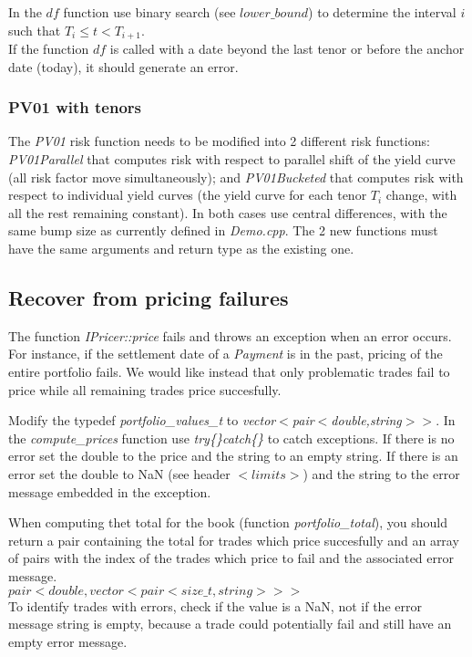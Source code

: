 \documentclass[10pt]{article}
\begin{document}
In the $df$ function use binary search (see $lower\_bound$) to determine the interval $i$ such that $T_i \leq t < T_{i+1}$.\\

If the function $df$ is called with a date beyond the last tenor or before the anchor date (today), it should generate an error.

\subsubsection{PV01 with tenors}
\label{sec:pv01}
The \textit{PV01} risk function needs to be modified into 2 different risk functions: \textit{PV01Parallel} that computes risk with respect to parallel shift of the yield curve (all risk factor move simultaneously); and \textit{PV01Bucketed} that computes risk with respect to individual yield curves (the yield curve for each tenor $T_i$ change, with all the rest remaining constant). In both cases use central differences, with the same bump size as currently defined in \textit{Demo.cpp}. The 2 new functions must have the same arguments and return type as the existing one.

\subsection{Recover from pricing failures}
The function \textit{IPricer::price} fails and throws an exception when an error occurs. For instance, if the settlement date of a \textit{Payment} is in the past, pricing of the entire portfolio fails. We would like instead that only problematic trades fail to price while all remaining trades price succesfully.

Modify the typedef \textit{portfolio\_values\_t} to \textit{vector$<$pair$<$double,string$>>$}. In the \textit{compute\_prices} function use \textit{try\{\}catch\{\}} to catch exceptions. If there is no error set the double to the price and the string to an empty string. If there is an error set the double to NaN (see header $<limits>$) and the string to the error message embedded in the exception.

When computing thet total for the book (function \textit{portfolio\_total}), you should return a pair containing the total for trades which price succesfully and an array of pairs with the index of the trades which price to fail and the associated error message.\\
$pair<double,vector<pair<size\_t,string>>>$\\
To identify trades with errors, check if the value is a NaN, not if the error message string is empty, because a trade could potentially fail and still have an empty error message.
\end{document}
